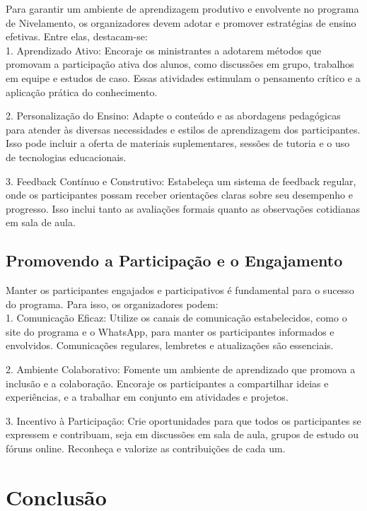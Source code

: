 Para garantir um ambiente de aprendizagem produtivo e envolvente no programa de Nivelamento, os organizadores devem adotar e promover estratégias de ensino efetivas. Entre elas, destacam-se:\\

1. Aprendizado Ativo: Encoraje os ministrantes a adotarem métodos que promovam a participação ativa dos alunos, como discussões em grupo, trabalhos em equipe e estudos de caso. Essas atividades estimulam o pensamento crítico e a aplicação prática do conhecimento.

2. Personalização do Ensino: Adapte o conteúdo e as abordagens pedagógicas para atender às diversas necessidades e estilos de aprendizagem dos participantes. Isso pode incluir a oferta de materiais suplementares, sessões de tutoria e o uso de tecnologias educacionais.

3. Feedback Contínuo e Construtivo: Estabeleça um sistema de feedback regular, onde os participantes possam receber orientações claras sobre seu desempenho e progresso. Isso inclui tanto as avaliações formais quanto as observações cotidianas em sala de aula.

\subsection{Promovendo a Participação e o Engajamento}

Manter os participantes engajados e participativos é fundamental para o sucesso do programa. Para isso, os organizadores podem:\\

1. Comunicação Eficaz: Utilize os canais de comunicação estabelecidos, como o site do programa e o WhatsApp, para manter os participantes informados e envolvidos. Comunicações regulares, lembretes e atualizações são essenciais.

2. Ambiente Colaborativo: Fomente um ambiente de aprendizado que promova a inclusão e a colaboração. Encoraje os participantes a compartilhar ideias e experiências, e a trabalhar em conjunto em atividades e projetos.

3. Incentivo à Participação: Crie oportunidades para que todos os participantes se expressem e contribuam, seja em discussões em sala de aula, grupos de estudo ou fóruns online. Reconheça e valorize as contribuições de cada um.

\section{Conclusão}

